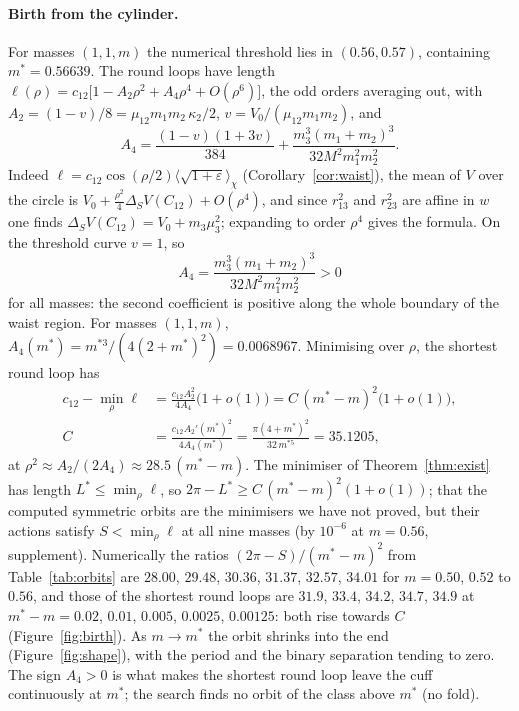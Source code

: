 \documentclass[11pt]{article}
\theoremstyle{definition}
\begin{document}
\paragraph{Birth from the cylinder.} For masses $(1,1,m)$ the numerical threshold lies in $(0.56,0.57)$, containing
$m^*=0.56639$. The round loops have length $\ell(\rho)=c_{12}\bigl[1-A_2\rho^2+A_4\rho^4+O(\rho^6)\bigr]$, the odd orders
averaging out, with $A_2=(1-v)/8=\mu_{12}m_1m_2\,\kappa_2/2$, $v=V_0/(\mu_{12}m_1m_2)$, and
\[
  A_4=\frac{(1-v)(1+3v)}{384}+\frac{m_3^3(m_1+m_2)^3}{32M^2m_1^2m_2^2}.
\]
Indeed $\ell=c_{12}\cos(\rho/2)\langle\sqrt{1+\varepsilon}\rangle_\chi$ (Corollary~\ref{cor:waist}), the mean of $V$
over the circle is $V_0+\tfrac{\rho^2}{4}\Delta_SV(C_{12})+O(\rho^4)$, and since $r_{13}^2$ and $r_{23}^2$ are affine
in $w$ one finds $\Delta_SV(C_{12})=V_0+m_3\mu_3^2$; expanding to order $\rho^4$ gives the formula. On the threshold curve $v=1$, so
\[
  A_4=\frac{m_3^3(m_1+m_2)^3}{32M^2m_1^2m_2^2}>0
\]
for all masses: the second coefficient is positive along the whole boundary of the waist region. For masses $(1,1,m)$,
$A_4(m^*)=m^{*3}/(4(2+m^*)^2)=0.0068967$. Minimising over $\rho$, the shortest round loop has
\begin{align*}
  c_{12}-\min_\rho\ell&=\frac{c_{12}A_2^2}{4A_4}\bigl(1+o(1)\bigr)=C\,(m^*-m)^2\bigl(1+o(1)\bigr),\\
  C&=\frac{c_{12}A_2'(m^*)^2}{4A_4(m^*)}=\frac{\pi(4+m^*)^2}{32\,m^{*5}}=35.1205,
\end{align*}
at $\rho^2\approx A_2/(2A_4)\approx28.5\,(m^*-m)$. The minimiser of Theorem~\ref{thm:exist} has length
$L^*\le\min_\rho\ell$, so $2\pi-L^*\ge C\,(m^*-m)^2(1+o(1))$; that the computed symmetric orbits are the minimisers we
have not proved, but their actions satisfy $S<\min_\rho\ell$ at all nine masses (by $10^{-6}$ at $m=0.56$, supplement).
Numerically the ratios $(2\pi-S)/(m^*-m)^2$ from Table~\ref{tab:orbits} are $28.00$,
$29.48$, $30.36$, $31.37$, $32.57$, $34.01$ for $m=0.50$, $0.52$ to $0.56$, and those of the shortest round loops are
$31.9$, $33.4$, $34.2$, $34.7$, $34.9$ at $m^*-m=0.02$, $0.01$, $0.005$, $0.0025$, $0.00125$: both rise towards $C$
(Figure~\ref{fig:birth}). As $m\to m^*$ the orbit shrinks into the end (Figure~\ref{fig:shape}), with the period and the
binary separation tending to zero. The sign $A_4>0$ is what makes the shortest round loop leave the cuff continuously
at $m^*$; the search finds no orbit of the class above $m^*$ (no fold).
\end{document}
